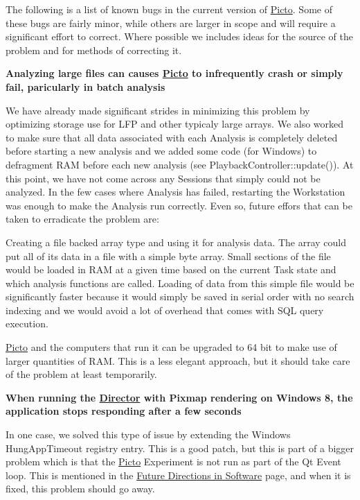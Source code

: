 The following is a list of known bugs in the current version of \hyperlink{namespace_picto}{Picto}. Some of these bugs are fairly minor, while others are larger in scope and will require a significant effort to correct. Where possible we includes ideas for the source of the problem and for methods of correcting it.

{\bfseries Analyzing large files can causes \hyperlink{namespace_picto}{Picto} to infrequently crash or simply fail, paricularly in batch analysis}\par
 We have already made significant strides in minimizing this problem by optimizing storage use for L\-F\-P and other typicaly large arrays. We also worked to make sure that all data associated with each Analysis is completely deleted before starting a new analysis and we added some code (for Windows) to defragment R\-A\-M before each new analysis (see Playback\-Controller\-::update()). At this point, we have not come across any Sessions that simply could not be analyzed. In the few cases where Analysis has failed, restarting the Workstation was enough to make the Analysis run correctly. Even so, future effors that can be taken to erradicate the problem are\-:
\begin{DoxyItemize}
\item Creating a file backed array type and using it for analysis data. The array could put all of its data in a file with a simple byte array. Small sections of the file would be loaded in R\-A\-M at a given time based on the current Task state and which analysis functions are called. Loading of data from this simple file would be significantly faster because it would simply be saved in serial order with no search indexing and we would avoid a lot of overhead that comes with S\-Q\-L query execution.
\item \hyperlink{namespace_picto}{Picto} and the computers that run it can be upgraded to 64 bit to make use of larger quantities of R\-A\-M. This is a less elegant approach, but it should take care of the problem at least temporarily.
\end{DoxyItemize}

{\bfseries When running the \hyperlink{class_director}{Director} with Pixmap rendering on Windows 8, the application stops responding after a few seconds}\par
 In one case, we solved this type of issue by extending the Windows Hung\-App\-Timeout registry entry. This is a good patch, but this is part of a bigger problem which is that the \hyperlink{namespace_picto}{Picto} Experiment is not run as part of the Qt Event loop. This is mentioned in the \hyperlink{future_directions_software}{Future Directions in Software} page, and when it is fixed, this problem should go away.

